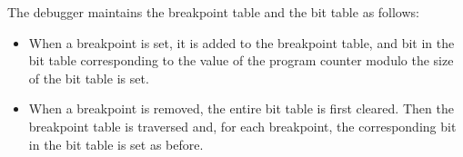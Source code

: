 The debugger maintains the breakpoint table and the bit table as
follows:

\begin{itemize}
\item When a breakpoint is set, it is added to the breakpoint table,
  and bit in the bit table corresponding to the value of the program
  counter modulo the size of the bit table is set.
\item When a breakpoint is removed, the entire bit table is first
  cleared.  Then the breakpoint table is traversed and, for each
  breakpoint, the corresponding bit in the bit table is set as
  before.
\end{itemize}

